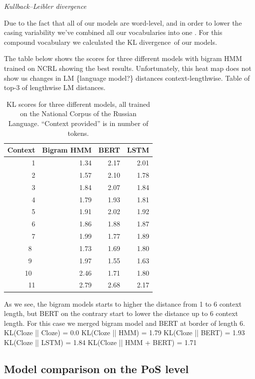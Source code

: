 \documentclass[a4paper]{article}
\newcommand{\head}[1]{\vspace{0.5em}\emph{#1}\vspace{0.25em}}
\begin{document}
\head{Kullback–Leibler divergence} %

Due to the fact that all of our models are word-level, and in order to lower the casing variability we've combined all our vocabularies into one
. For this compound vocabulary we calculated the KL divergence of our models.

The table below shows the scores for three different models with
bigram HMM trained on NCRL showing the best results. Unfortunately,
this heat map does not show us changes in LM \{language model?\} distances context-lengthwise. Table of top-3 of lengthwise LM distances.

\begin{table}
\centering

\caption{KL scores for three different models, all trained on the
National Corpus of the Russian Language. ``Context provided'' is in number
of tokens.}

\begin{tabular}{rrrr}
\textbf{Context} &
\textbf{Bigram HMM} &
\textbf{BERT} &
\textbf{LSTM} \\
\hline
1 &
1.34 &
2.17 &
2.01 \\
2 &
1.57 &
2.10 &
1.78 \\
3 &
1.84 &
2.07 &
1.84 \\
4 &
1.79 &
1.93 &
1.81 \\
5 &
1.91 &
2.02 &
1.92 \\
6 &
1.86 &
1.88 &
1.87 \\
7 &
1.99 &
1.77 &
1.89 \\
8 &
1.73 &
1.69 &
1.80 \\
9 &
1.97 &
1.55 &
1.63 \\
10 &
2.46 &
1.71 &
1.80 \\
11 &
2.79 &
2.68 &
2.17
\end{tabular}
\end{table}

As we see, the bigram models starts to higher the distance from 1 to 6 context length, but BERT on the contrary start to lower the distance up to 6 context length. For this case we merged bigram model and BERT at border of length 6.
KL(Cloze || Cloze) = 0.0
KL(Cloze || HMM) = 1.79
KL(Cloze || BERT) = 1.93
KL(Cloze || LSTM) = 1.84
KL(Cloze || HMM + BERT) = 1.71

\subsection{Model comparison on the PoS level} %
\end{document}
